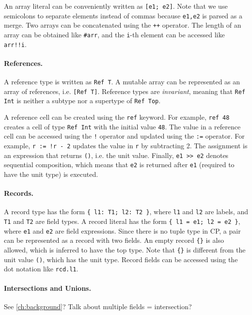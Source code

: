 An array literal can be conveniently written as \lstinline{[e1; e2]}. Note that
we use semicolons to separate elements instead of commas because
\lstinline{e1,e2} is parsed as a merge. Two arrays can be concatenated using the
\lstinline{++} operator. The length of an array can be obtained like
\lstinline{#arr}, and the \lstinline{i}-th element can be accessed like
\lstinline{arr!!i}.

\paragraph{References.}
A reference type is written as \lstinline{Ref T}. A mutable array can be
represented as an array of references, i.e. \lstinline{[Ref T]}. Reference types
are \emph{invariant}, meaning that \lstinline{Ref Int} is neither a subtype nor
a supertype of \lstinline{Ref Top}.

A reference cell can be created using the \lstinline{ref} keyword. For example,
\lstinline{ref 48} creates a cell of type \lstinline{Ref Int} with the initial
value \lstinline{48}. The value in a reference cell can be accessed using the
\lstinline{!} operator and updated using the \lstinline{:=} operator. For
example, \lstinline{r := !r - 2} updates the value in \lstinline{r} by
subtracting 2. The assignment is an expression that returns \lstinline{()}, i.e.
the unit value. Finally, \lstinline{e1 >> e2} denotes sequential composition,
which means that \lstinline{e2} is returned after \lstinline{e1} (required to
have the unit type) is executed.

\paragraph{Records.}
A record type has the form \lstinline|{ l1: T1; l2: T2 }|, where \lstinline{l1}
and \lstinline{l2} are labels, and \lstinline{T1} and \lstinline{T2} are field
types. A record literal has the form \lstinline|{ l1 = e1; l2 = e2 }|, where
\lstinline{e1} and \lstinline{e2} are field expressions. Since there is no tuple
type in CP, a pair can be represented as a record with two fields. An empty
record \lstinline|{}| is also allowed, which is inferred to have the top type.
Note that \lstinline|{}| is different from the unit value \lstinline|()|, which
has the unit type. Record fields can be accessed using the dot notation like
\lstinline{rcd.l1}.

\paragraph{Intersections and Unions.}
See \autoref{ch:background}? Talk about multiple fields = intersection?

